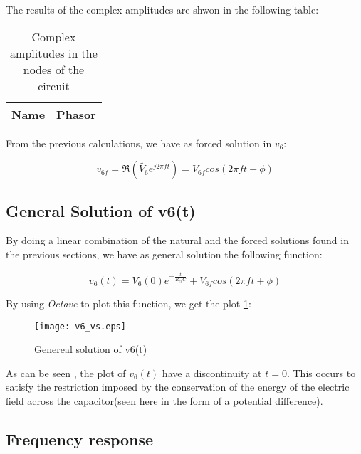 \hfill


The results of the complex amplitudes are shwon in the following table:

\begin{table}[b]
  \centering
  \begin{tabular}{|l|c|}
    \hline
    {\bf Name} & {\bf Phasor} \\ \hline
    
  \end{tabular}
  \caption{Complex amplitudes in the nodes of the circuit}
  \label{tab:op_tabNodal}
\end{table}


From the previous calculations, we have as forced solution in $v_6$:

\begin{equation}
  v_{6f} = \Re (\tilde{V_6} e^{j 2\pi f t}) = V_{6f} cos(2 \pi f t + \phi)
  \label{forcedSolution}
\end{equation}


\subsection{General Solution of v6(t)}

By doing a linear combination of the natural and the forced solutions found in the previous sections, we have as general solution the following function:

\begin{equation}
  v_6(t) = V _6(0)e^{-\frac{t}{R_{eq}C}} + V_{6f} cos(2 \pi f t + \phi)
  \label{finalSolution}
\end{equation}

By using \textit{Octave} to plot this function, we get the plot \ref{fig:generalFinal}:

\begin{figure}[h] \centering
  \texttt{[image: v6\_vs.eps]}
  \caption{Genereal solution of v6(t)}
  \label{fig:generalFinal}
\end{figure}


As can be seen , the plot of $v_6(t)$ have a discontinuity at $t = 0$.
This occurs to satisfy the restriction imposed by the conservation of the energy  of the electric field across the capacitor(seen here in the form of a potential difference).


\subsection{Frequency response}

